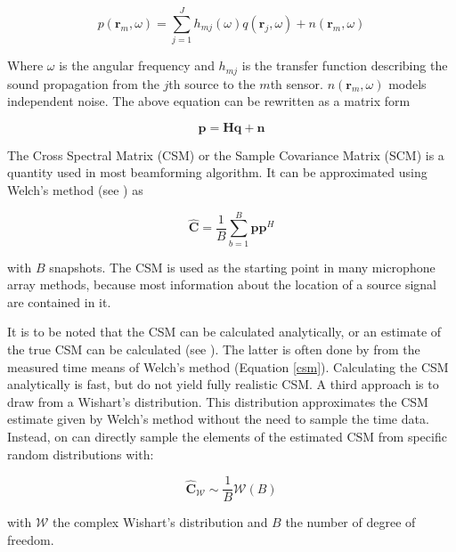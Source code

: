 \documentclass[11pt,a4paper,twoside]{report}
\begin{document}
\begin{equation}
    p(\mathbf{r}_m, \omega) = \sum_{j = 1}^{J} h_{mj}(\omega)q(\mathbf{r}_j, \omega) + n(\mathbf{r}_m, \omega)
\end{equation}

Where $\omega$ is the angular frequency and $h_{mj}$ is the transfer function  describing the sound propagation from the $j$th source to the $m$th sensor. $n(\mathbf{r}_m, \omega)$ models independent noise. The above equation can be rewritten as a matrix form

\begin{equation}
    \mathbf{p} = \mathbf{H} \mathbf{q} + \mathbf{n}
\end{equation}

The Cross Spectral Matrix (CSM) or the Sample Covariance Matrix (SCM) is a quantity used in most beamforming algorithm. It can be approximated using Welch's method (see \cite{welch1967use}) as


\begin{equation}
    \label{csm}
    \hat{\mathbf{C}} = \frac{1}{B} \sum_{b = 1}^{B} \mathbf{p}\mathbf{p}^H
\end{equation}

with $B$ snapshots. The CSM is used as the starting point in many microphone array methods, because most information about the location of a source signal are contained in it.

It is to be noted that the CSM can be calculated analytically, or an estimate of the true CSM can be calculated (see \cite{kujawski2022fast}). The latter is often done by from the measured time means of Welch's method (Equation \ref{csm}). Calculating the CSM analytically is fast, but do not yield fully realistic CSM. A third approach is to draw from a Wishart's distribution. This distribution approximates the CSM estimate given by Welch's method without the need to sample the time data. Instead, on can directly sample the elements of the estimated CSM from specific random distributions with:

\begin{equation}
    \hat{\mathbf{C}}_{\mathcal{W}} \sim \frac{1}{B}\mathcal{W}(B)
\end{equation}

with $\mathcal{W}$ the complex Wishart's distribution and $B$ the number of degree of freedom.
\end{document}
